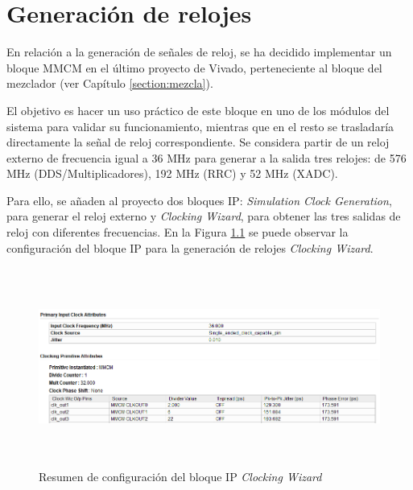 \chapter{Generación de relojes}
\label{section:mmcm}

En relación a la generación de señales de reloj, se ha decidido implementar un bloque MMCM en el último proyecto de Vivado, perteneciente al bloque del mezclador (ver Capítulo \ref{section:mezcla}).


\vspace{3mm}

El objetivo es hacer un uso práctico de este bloque en uno de los módulos del sistema para validar su funcionamiento, mientras que en el resto se trasladaría directamente la señal de reloj correspondiente. Se considera partir de un reloj externo de frecuencia igual a 36 MHz para generar a la salida tres relojes: de 576 MHz (DDS/Multiplicadores), 192 MHz (RRC)
y 52 MHz (XADC). 

\vspace{3mm}

Para ello, se añaden al proyecto dos bloques IP: \textit{Simulation Clock Generation}, para generar el reloj externo y \textit{Clocking Wizard}, para obtener las tres salidas de reloj con diferentes frecuencias. En la Figura \ref{fig:mmcm} se puede observar la configuración del bloque IP para la generación de relojes \textit{Clocking Wizard}.

\vspace{3mm}

\begin{figure}[h]
	\centering
	\includegraphics[width=1\textwidth, height=6.5cm]{img/diseno/mmcm.PNG}
	\caption{Resumen de configuración del bloque IP \textit{Clocking Wizard}}
	\label{fig:mmcm}
\end{figure}

